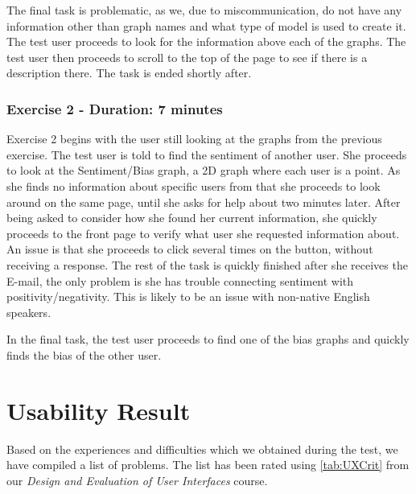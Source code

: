 The final task is problematic, as we, due to miscommunication, do not have any
information other than graph names and what type of model is used to create it.
The test user proceeds to look for the information above each of the graphs. The
test user then proceeds to scroll to the top of the page to see if there is a
description there. The task is ended shortly after.

\subsubsection{Exercise 2 - Duration: 7 minutes}
Exercise 2 begins with the user still looking at the graphs from the previous
exercise. The test user is told to find the sentiment of another user. She proceeds
to look at the Sentiment/Bias graph, a 2D graph where each user is a point. As
she finds no information about specific users from that she proceeds to look
around on the same page, until she asks for help about two minutes later. After
being asked to consider how she found her current information, she quickly
proceeds to the front page to verify what user she requested information about.
An issue is that she proceeds to click several times on the button, without
receiving a response. The rest of the task is quickly finished after she
receives the E-mail, the only problem is she has trouble connecting sentiment
with positivity/negativity. This is likely to be an issue with non-native
English speakers.\nl

In the final task, the test user proceeds to find one of the bias graphs
and quickly finds the bias of the other user.

\section{Usability Result}\label{sec:UXUR}
Based on the experiences and difficulties which we obtained during the test,
we have compiled a list of problems. The list has been rated using
\autoref{tab:UXCrit} from our \textit{Design and Evaluation of User Interfaces}
course.


